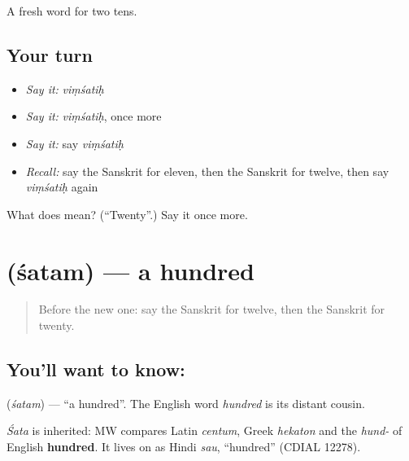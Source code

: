 \begin{grammarlens}[title={What you've built}]
A fresh word for two tens.
\end{grammarlens}

\subsection*{Your turn}
\begin{itemize}
\raggedright
  \item \emph{Say it:} \emph{viṃśatiḥ}
  \item \emph{Say it:} \emph{viṃśatiḥ}, once more
  \item \emph{Say it:} say \emph{viṃśatiḥ}
  \item \emph{Recall:} say the Sanskrit for eleven, then the Sanskrit for twelve, then say \emph{viṃśatiḥ} again
\end{itemize}

\begin{tcolorbox}[breakable,colback=teal!4,colframe=teal!35!black,title={Before you move on}]
What does  mean? (\textquotedblleft{}Twenty\textquotedblright{}.) Say it once more.
\end{tcolorbox}
\section[\texorpdfstring{\sk{शतम्} (śatam)}{शतम् (śatam)}]{ (śatam) — a hundred}

\label{lesson:SA-C87-hundred}



\begin{quote}
Before the new one: say the Sanskrit for twelve, then the Sanskrit for twenty.
\end{quote}

\subsection*{You'll want to know: }
\textbf{} (\emph{śatam}) — \textquotedblleft{}a hundred\textquotedblright{}. The English word \emph{hundred} is its distant cousin.

\begin{cousinweb}
\emph{Śata} is inherited: MW compares Latin \emph{centum}, Greek \emph{hekaton} and the \emph{hund-} of English \textbf{hundred}. It lives on as Hindi \emph{sau}, \textquotedblleft{}hundred\textquotedblright{} (CDIAL 12278).
\end{cousinweb}

